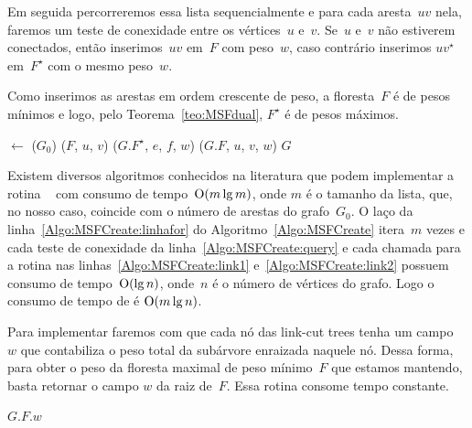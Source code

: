 
Em seguida percorreremos essa lista sequencialmente e para cada aresta~$uv$ nela, faremos um teste de conexidade entre os vértices~$u$ e~$v$.
Se~$u$ e~$v$ não estiverem conectados, então inserimos~$uv$ em~$F$ com peso~$w$, caso contrário inserimos $uv^\star$ em~$F^\star$ com o mesmo peso~$w$.

Como inserimos as arestas em ordem crescente de peso, a floresta~$F$ é de pesos mínimos e logo, pelo Teorema~\ref{teo:MSFdual}, $F^\star$ é de pesos máximos.

\begin{algorithm}[htb]
\caption{\MSFCreate($n$, $G_0$)}
\label{Algo:MSFCreate}
\begin{algorithmic}[1]
\State {} $\gets$ \order($G_0$)
\label{Algo:MSFCreate:linhafor}
\If \linkcutQuery($F$, $u$, $v$)\label{Algo:MSFCreate:query}
\State \linkcutAddEdge($G$.$F^\star$, $e$, $f$, $w$)\label{Algo:MSFCreate:link1}
\Else
\State \linkcutAddEdge($G$.$F$, $u$, $v$, $w$)\label{Algo:MSFCreate:link2}
\EndIf
\EndFor
\State \Return $G$
\end{algorithmic}
\end{algorithm}

Existem diversos algoritmos conhecidos na literatura que podem implementar a rotina \order{}~\cite{CLRS} com consumo de tempo~$\mathrm{O}(m\lg m)$, onde $m$ é o tamanho da lista,
que, no nosso caso, coincide com o número de arestas do grafo~$G_0$.
O laço da linha~\ref{Algo:MSFCreate:linhafor} do Algoritmo~\ref{Algo:MSFCreate} itera~$m$ vezes e cada teste de conexidade da linha~\ref{Algo:MSFCreate:query} e cada chamada para a rotina  \linkcutAddEdge{} nas linhas~\ref{Algo:MSFCreate:link1} e~\ref{Algo:MSFCreate:link2} possuem consumo de tempo~$\mathrm{O}(\lg n)$, onde~$n$ é o número de vértices do grafo.
Logo o consumo de tempo de \MSFCreate{} é $\mathrm{O}(m\lg n)$.

Para implementar \MSFweight{} faremos com que cada nó das link-cut trees tenha um campo~$w$ que contabiliza o peso total da subárvore enraizada naquele nó.
Dessa forma, para obter o peso da floresta maximal de peso mínimo~$F$ que estamos mantendo, basta retornar o campo $w$ da raiz de~$F$.
Essa rotina consome tempo constante.

\begin{algorithm}[htb]
\caption{\MSFweight($G$)}
\label{Algo:MSFweight}
\begin{algorithmic}[1]
\State \Return $G$.$F$.$w$
\end{algorithmic}
\end{algorithm}

